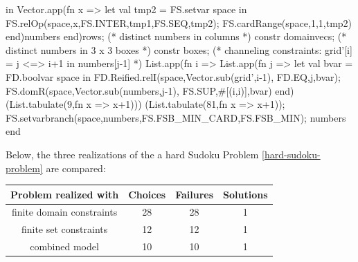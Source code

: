 \documentclass[a4paper,halfparskip]{scrartcl}
\begin{document}
\begin{myverbatim}
        in
           Vector.app(fn x => 
                let 
                   val tmp2 = FS.setvar space 
                in
                   FS.relOp(space,x,FS.INTER,tmp1,FS.SEQ,tmp2);
                   FS.cardRange(space,1,1,tmp2)
               end)numbers
        end)rows;
    (* distinct numbers in columns *)
     constr domainvecs;  
    (* distinct numbers in 3 x 3 boxes *)
     constr boxes;   
    (* channeling constraints: grid'[i] = j <=> i+1 in numbers[j-1] *)
     List.app(fn i => 
          List.app(fn j =>
             let
                val bvar = FD.boolvar space
             in  
                FD.Reified.relI(space,Vector.sub(grid',i-1),
                                     FD.EQ,j,bvar);
                FS.domR(space,Vector.sub(numbers,j-1),
                                     FS.SUP,#[(i,i)],bvar)
             end)
             (List.tabulate(9,fn x => x+1)))
         (List.tabulate(81,fn x => x+1));
     FS.setvarbranch(space,numbers,FS.FSB_MIN_CARD,FS.FSB_MIN); 
     numbers
  end

\end{myverbatim}


Below, the three realizations of the a hard Sudoku Problem
\ref{hard-sudoku-problem} are compared:

\begin{tabular}{||c|| c | c | c||}
\hline
Problem realized with & Choices & Failures & Solutions \\
\hline
\hline
finite domain constraints & 28 & 28 & 1  \\
\hline
finite set constraints & 12 & 12  & 1   \\
\hline
combined model & 10  & 10 & 1 \\
\hline
\end{tabular}



\newpage
\end{document}
